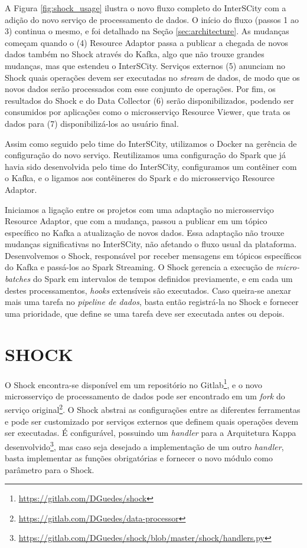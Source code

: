 A Figura \ref{fig:shock_usage} ilustra o novo fluxo completo do InterSCity
com a adição do novo serviço de processamento de dados. O início do fluxo
(passos 1 ao 3) continua o mesmo, e foi detalhado na Seção
\ref{sec:architecture}. As mudanças começam quando o (4) Resource Adaptor passa
a publicar a chegada de novos dados também no Shock através do Kafka, algo que
não trouxe grandes mudanças, mas que estendeu o InterSCity. Serviços externos
(5) anunciam no Shock quais operações devem ser executadas no \textit{stream}
de dados, de modo que os novos dados serão processados com esse conjunto de
operações. Por fim, os resultados do Shock e do Data Collector (6) serão
disponibilizados, podendo ser consumidos por aplicações como o microsserviço
Resource Viewer, que trata os dados para (7) disponibilizá-los ao usuário final.

Assim como seguido pelo time do InterSCity, utilizamos o Docker
na gerência de configuração do novo serviço. Reutilizamos uma configuração do
Spark que já havia sido desenvolvida pelo time do InterSCity, configuramos
um contêiner com o Kafka, e o ligamos aos contêineres do Spark e do
microsserviço Resource Adaptor.

Iniciamos a ligação entre os projetos com uma adaptação no microsserviço
Resource Adaptor, que com a mudança, passou a publicar em um tópico específico
no Kafka a atualização de novos dados. Essa adaptação não trouxe mudanças
significativas no InterSCity, não afetando o fluxo usual da plataforma.
Desenvolvemos o Shock, responsável por receber mensagens em tópicos
específicos do Kafka e passá-los ao Spark Streaming. O Shock gerencia a
execução de \textit{micro-batches} do Spark em intervalos de tempos definidos
previamente, e em cada um destes processamentos, \textit{hooks} extensíveis são
executados. Caso queira-se anexar mais uma tarefa no
\textit{pipeline de dados}, basta então registrá-la no Shock e fornecer uma
prioridade, que define se uma tarefa deve ser executada antes ou depois.

\section{SHOCK}

O Shock encontra-se disponível em um repositório no
Gitlab\footnote{\url{https://gitlab.com/DGuedes/shock}}, e o novo microsserviço
de processamento de dados pode ser encontrado em um \textit{fork} do serviço
original\footnote{\url{https://gitlab.com/DGuedes/data-processor}}. O Shock
abstrai as configurações entre as diferentes ferramentas e pode ser customizado
por serviços externos que definem quais operações devem ser executadas.
É configurável, possuindo um \textit{handler} para a Arquitetura Kappa
desenvolvido\footnote{\url{https://gitlab.com/DGuedes/shock/blob/master/shock/handlers.py}},
mas caso seja desejado a implementação de um outro \textit{handler}, basta
implementar as funções obrigatórias e fornecer o novo módulo como parâmetro
para o Shock.

